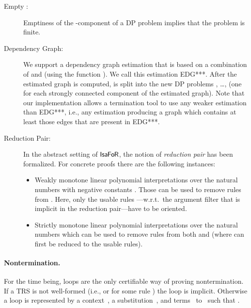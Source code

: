 \documentclass[a4paper,final]{easychair}
\theoremstyle{definition}
\newcommand\formatID[1]{\ensuremath{{\sf#1}}}
\newcommand\IsaFoR{\formatID{Isa\kern-0.10exF\kern-0.10exo\kern-0.10exR}}
\begin{document}
\begin{description}
\item[Empty :] Emptiness of the -component of a DP problem implies
that the problem is finite.

\item[Dependency Graph:] We support a dependency graph estimation that is based
on a combination of \cite{GTS05} and \cite{HM05} (using the function
). We call this estimation EDG***. After the estimated graph is computed,
 is split into the new DP problems , \ldots,
 (one for each strongly connected component of the estimated
graph). Note that our implementation allows a termination tool to use any
weaker estimation than EDG***, i.e., any estimation producing a
graph which contains at least those edges that are present in EDG***.

\item[Reduction Pair:] In the abstract setting of \IsaFoR{}, the notion
of \emph{reduction pair} has been formalized. For concrete proofs there
are the following instances:
\begin{itemize}
  \item Weakly monotone linear polynomial interpretations over the
  natural numbers with negative constants \cite{HM07}. Those can be used to remove
  rules from . Here, only the usable rules \cite{GTS05}---w.r.t.~the 
  argument filter that is implicit in the reduction pair---have to be oriented.

  \item Strictly monotone linear polynomial interpretations over the
  natural numbers which can be used to remove rules from both
   and  (where  can first be reduced to the usable rules).
\end{itemize}
\end{description}

\paragraph{Nontermination.}
For the time being, loops are the only certifiable way of proving
nontermination. If a TRS is not well-formed (i.e.,
 or  for some rule )
the loop is implicit. Otherwise a loop is represented by a
context~, a substitution~, and terms~ to~
such that .
\end{document}
